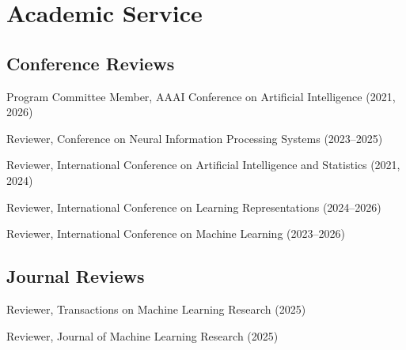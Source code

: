 \documentclass{article}
\begin{document}
\section{Academic Service}
\subsection{Conference Reviews}
\begin{compactList}
\item Program Committee Member, AAAI Conference on Artificial Intelligence (2021, 2026)
\item Reviewer, Conference on Neural Information Processing Systems (2023--2025)
\item Reviewer, International Conference on Artificial Intelligence and Statistics (2021, 2024)
\item Reviewer, International Conference on Learning Representations (2024--2026)
\item Reviewer, International Conference on Machine Learning (2023--2026)
\end{compactList}

\subsection{Journal Reviews}
\begin{compactList}
\item Reviewer, Transactions on Machine Learning Research (2025)
\item Reviewer, Journal of Machine Learning Research (2025)
\end{compactList}
\end{document}
